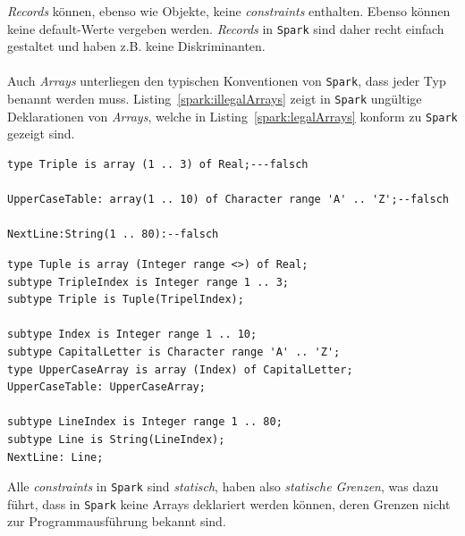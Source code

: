 \textit{Records} können, ebenso wie Objekte, keine \textit{constraints} enthalten. Ebenso können keine default-Werte vergeben werden. \textit{Records} in \texttt{Spark} sind daher recht einfach gestaltet und haben z.B. keine Diskriminanten.\\
\\
Auch \textit{Arrays} unterliegen den typischen Konventionen von \texttt{Spark}, dass jeder Typ benannt werden muss. Listing~\ref{spark:illegalArrays} zeigt in \texttt{Spark} ungültige Deklarationen von \textit{Arrays}, welche in Listing~\ref{spark:legalArrays} konform zu \texttt{Spark} gezeigt sind.

\begin{lstlisting}[caption={illegal Arrays}, label=spark:illegalArrays]
type Triple is array (1 .. 3) of Real;---falsch

UpperCaseTable: array(1 .. 10) of Character range 'A' .. 'Z';--falsch

NextLine:String(1 .. 80):--falsch
\end{lstlisting}
\begin{lstlisting}[caption={legal Arrays}, label=spark:legalArrays]
type Tuple is array (Integer range <>) of Real;
subtype TripleIndex is Integer range 1 .. 3;
subtype Triple is Tuple(TripelIndex);

subtype Index is Integer range 1 .. 10;
subtype CapitalLetter is Character range 'A' .. 'Z';
type UpperCaseArray is array (Index) of CapitalLetter;
UpperCaseTable: UpperCaseArray;

subtype LineIndex is Integer range 1 .. 80;
subtype Line is String(LineIndex);
NextLine: Line;
\end{lstlisting}

Alle \textit{constraints} in \texttt{Spark} sind \textit{statisch}, haben also \textit{statische Grenzen}, was dazu führt, dass in \texttt{Spark} keine Arrays deklariert werden können, deren Grenzen nicht zur Programmausführung bekannt sind.

